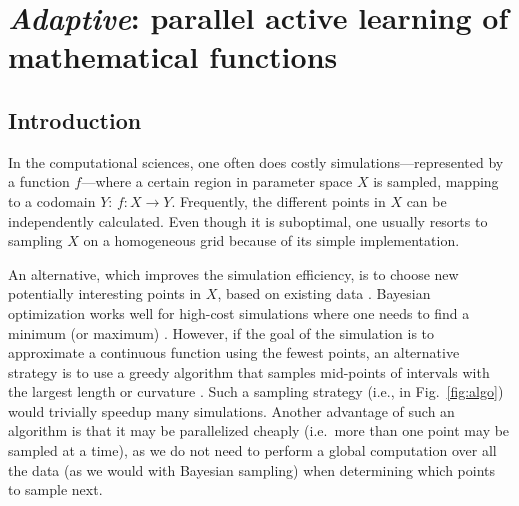 \chapter{\emph{Adaptive}: parallel active learning of mathematical functions}
\label{ch:adaptive}

\newpage
\noindent

\section{Introduction}


In the computational sciences, one often does costly simulations---represented by a function $f$---where a certain region in parameter space $X$ is sampled, mapping to a codomain $Y$: $f \colon X \to Y$.
Frequently, the different points in $X$ can be independently calculated.
Even though it is suboptimal, one usually resorts to sampling $X$ on a homogeneous grid because of its simple implementation.


An alternative, which improves the simulation efficiency, is to choose new potentially interesting points in $X$, based on existing data \cite{Gramacy2004, Figueiredo1995, Castro2008, Chen2017}.
Bayesian optimization works well for high-cost simulations where one needs to find a minimum (or maximum) \cite{Takhtaganov2018}.
However, if the goal of the simulation is to approximate a continuous function using the fewest points, an alternative strategy is to use a greedy algorithm that samples mid-points of intervals with the largest length or curvature \cite{Wolfram2011}.
Such a sampling strategy (i.e., in Fig.~\ref{fig:algo}) would trivially speedup many simulations.
Another advantage of such an algorithm is that it may be parallelized cheaply (i.e.~more than one point may be sampled at a time), as we do not need to perform a global computation over all the data (as we would with Bayesian sampling) when determining which points to sample next.

